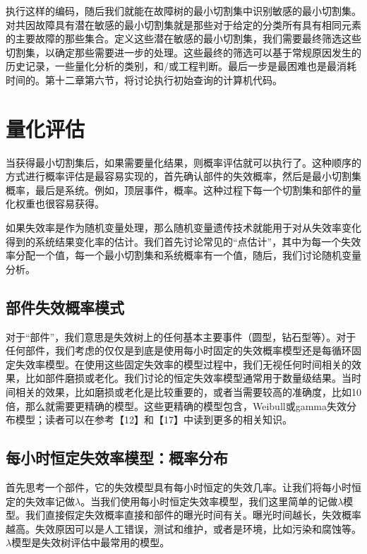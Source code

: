 \documentclass[cn,11pt,chinese]{elegantbook}
\begin{document}
{执行这样的编码，随后我们就能在故障树的最小切割集中识别敏感的最小切割集。对共因故障具有潜在敏感的最小切割集就是那些对于给定的分类所有具有相同元素的主要故障的那些集合。定义这些潜在敏感的最小切割集，我们需要最终筛选这些切割集，以确定那些需要进一步的处理。这些最终的筛选可以基于常规原因发生的历史记录，一些量化分析的类别，和/或工程判断。最后一步是最困难也是最消耗时间的。第十二章第六节，将讨论执行初始查询的计算机代码。

\section{量化评估}

当获得最小切割集后，如果需要量化结果，则概率评估就可以执行了。这种顺序的方式进行概率评估是最容易实现的，首先确认部件的失效概率，然后是最小切割集概率，最后是系统。例如，顶层事件，概率。这种过程下每一个切割集和部件的量化权重也很容易获得。

如果失效率是作为随机变量处理，那么随机变量遗传技术就能用于对从失效率变化得到的系统结果变化率的估计。我们首先讨论常见的“点估计”，其中为每一个失效率分配一个值，每一个最小切割集和系统概率有一个值，随后，我们讨论随机变量分析。

\subsection{部件失效概率模式}

对于“部件”，我们意思是失效树上的任何基本主要事件（圆型，钻石型等）。对于任何部件，我们考虑的仅仅是到底是使用每小时固定的失效概率模型还是每循环固定失效率模型。在使用这些固定失效率的模型过程中，我们无视任何时间相关的效果，比如部件磨损或老化。我们讨论的恒定失效率模型通常用于数量级结果。当时间相关的效果，比如磨损或老化是比较重要的，或者当需要较高的准确度，比如10倍，那么就需要更精确的模型。这些更精确的模型包含，Weibull或gamma失效分布模型；读者可以在参考【12】和【17】中读到更多的相关知识。

\subsection{每小时恒定失效率模型：概率分布}

首先思考一个部件，它的失效模型具有每小时恒定的失效几率。让我们将每小时恒定的失效率记做$\lambda$。当我们使用每小时恒定失效率模型，我们这里简单的记做$\lambda$模型。我们直接假定失效概率直接和部件的曝光时间有关。曝光时间越长，失效概率越高。失效原因可以是人工错误，测试和维护，或者是环境，比如污染和腐蚀等。$\lambda$模型是失效树评估中最常用的模型。

}
\end{document}
